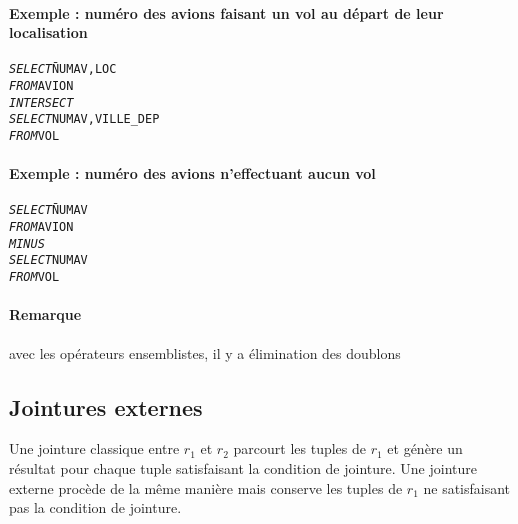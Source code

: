 \documentclass[10pt]{article}
\begin{document}
			\paragraph{Exemple : numéro des avions faisant un vol au départ de leur localisation}
				\begin{alltt}
					\begin{tabbing}
						\emph{SELECT} \= NUMAV, LOC\\
						\emph{FROM} \> AVION\\
						\emph{INTERSECT}\\
						\emph{SELECT} \> NUMAV, VILLE_DEP\\
						\emph{FROM} \> VOL\\
					\end{tabbing}
				\end{alltt}
				
			\paragraph{Exemple : numéro des avions n'effectuant aucun vol}\index{MINUS}
				\begin{alltt}
					\begin{tabbing}
						\emph{SELECT} \= NUMAV\\
						\emph{FROM} \> AVION\\
						\emph{MINUS}\\
						\emph{SELECT} \> NUMAV\\
						\emph{FROM} \> VOL\\
					\end{tabbing}
				\end{alltt}
				
			\paragraph{Remarque} avec les opérateurs ensemblistes, il y a élimination des doublons
			
		\subsection{Jointures externes}
			Une jointure classique entre $r_1$ et $r_2$ parcourt les tuples de $r_1$ et génère un résultat pour chaque tuple satisfaisant la condition de jointure. Une jointure externe procède de la même manière mais conserve les tuples de $r_1$ ne satisfaisant pas la condition de jointure.
			
\end{document}
